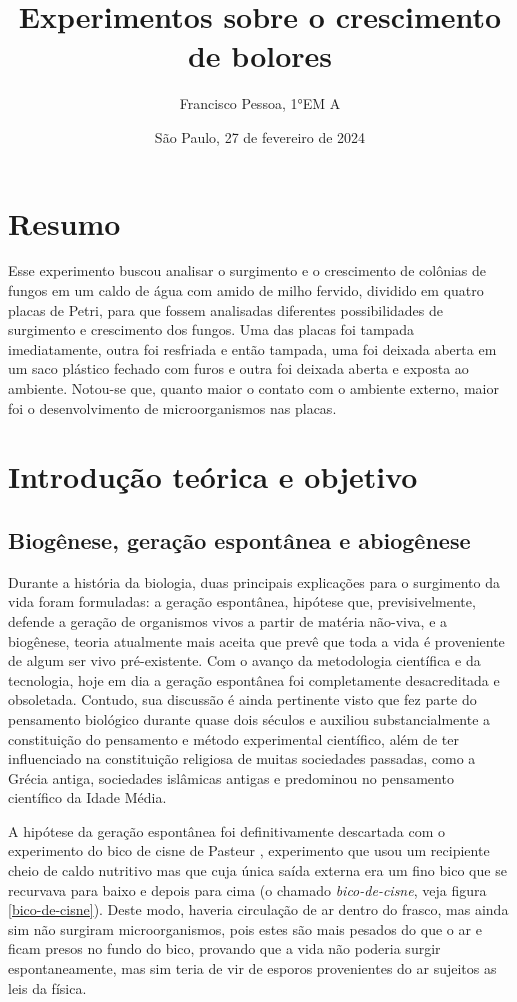 \documentclass[12pt, titlepage]{article}
\author{Francisco Pessoa, 1°EM A}
\affil{Colégio Ítaca}
\date{São Paulo, 27 de fevereiro de 2024}
\title{Experimentos sobre o crescimento de bolores}
\begin{document}
\maketitle

\section*{Resumo}
Esse experimento buscou analisar o surgimento e o crescimento de colônias de fungos em um caldo de água com amido de milho fervido, dividido em quatro placas de Petri, para que fossem analisadas diferentes possibilidades de surgimento e crescimento dos fungos. Uma das placas foi tampada imediatamente, outra foi resfriada e então tampada, uma foi deixada aberta em um saco plástico fechado com furos e outra foi deixada aberta e exposta ao ambiente. Notou-se que, quanto maior o contato com o ambiente externo, maior foi o desenvolvimento de microorganismos nas placas.

\section{Introdução teórica e objetivo}
\subsection{Biogênese, geração espontânea e abiogênese\label{intro-surg-vida}}
Durante a história da biologia, duas principais explicações para o surgimento da vida foram formuladas: a geração espontânea, hipótese que, previsivelmente, defende a geração de organismos vivos a partir de matéria não-viva, e a biogênese, teoria atualmente mais aceita que prevê que toda a vida é proveniente de algum ser vivo pré-existente. Com o avanço da metodologia científica e da tecnologia, hoje em dia a geração espontânea foi completamente desacreditada e obsoletada. Contudo, sua discussão é ainda pertinente visto que fez parte do pensamento biológico durante quase dois séculos e auxiliou substancialmente a constituição do pensamento e método experimental científico, além de ter influenciado na constituição religiosa de muitas sociedades passadas, como a Grécia antiga, sociedades islâmicas antigas e predominou no pensamento científico da Idade Média.

A hipótese da geração espontânea foi definitivamente descartada com o experimento do bico de cisne de Pasteur \cite{bsfi2019pasteur,enwiki:1195385720}, experimento que usou um recipiente cheio de caldo nutritivo mas que cuja única saída externa era um fino bico que se recurvava para baixo e depois para cima (o chamado \textit{bico-de-cisne}, veja figura \ref{bico-de-cisne}). Deste modo, haveria circulação de ar dentro do frasco, mas ainda sim não surgiram microorganismos, pois estes são mais pesados do que o ar e ficam presos no fundo do bico, provando que a vida não poderia surgir espontaneamente, mas sim teria de vir de esporos provenientes do ar sujeitos as leis da física. 
\end{document}
